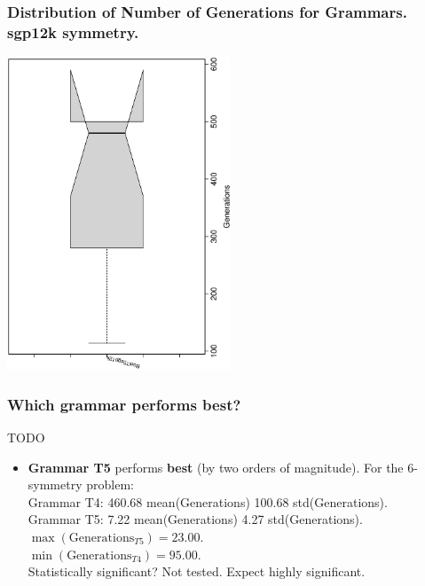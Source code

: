 \documentclass[18pt,c]{beamer}
\begin{document}
 \begin{frame}
 \frametitle{ Distribution of Number of Generations for Grammars. sgp12k  symmetry. }
 \begin{center}
\includegraphics[width=0.5\textwidth, angle=-90]
{ExpFboxplottGenerations010.eps}
 \end{center}
 \label{ExpFboxplottGenerations010.eps}  
 \end{frame}

\begin{frame}
\frametitle{
Which grammar performs best?
}
TODO \begin{itemize}
\item {\bf Grammar T5} performs {\bf best} (by two orders of magnitude).
        For the 6-symmetry problem:\\
       Grammar T4: 460.68 mean(Generations) 100.68 std(Generations).\\
       Grammar T5: 7.22 mean(Generations)     4.27 std(Generations).\\
       $\max(\mbox{Generations}_{T5})=23.00$. \\
       $\min(\mbox{Generations}_{T4})=95.00$. \\
 
Statistically significant? Not tested. Expect highly significant.
\end{itemize}
\end{frame}%
\clearpage
\end{document}
